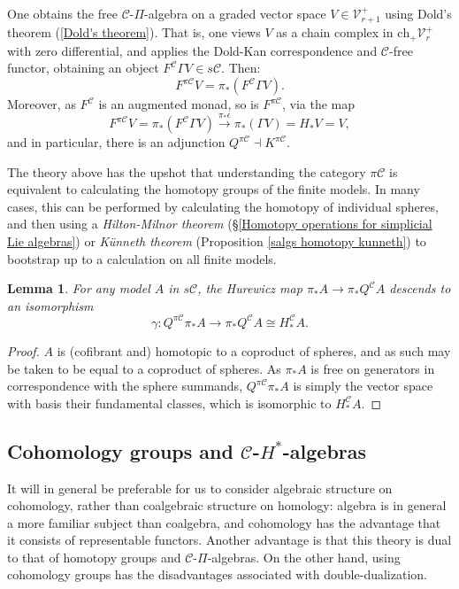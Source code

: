 \documentclass[11pt]{amsart} \renewcommand{\baselinestretch}{1.4}
\theoremstyle{plain}
\newtheorem{lem}[thm]{Lemma}
\theoremstyle{definition}
\renewcommand{\to}{\longrightarrow}
\newcommand{\calC}{\mathcal{C}}
\newcommand{\calV}{\mathcal{V}}
\newcommand{\calc}{\mathcal{C}}
\newcommand{\vect}[2]{\calV^{#1}_{#2}}
\newcommand{\PA}[1]{\pi#1}
\newcommand{\complexes}{\mathrm{ch}_+}
\begin{document}
\begin{Pi-algebras and cohomology algebras}
One obtains the free $\calc$-$\Pi$-algebra on a graded vector space $V\in \vect{+}{r+1}$ using Dold's theorem (\ref{Dold's theorem}). That is, one views $V$ as a chain complex in $\complexes\vect{+}{r}$ with zero differential, and applies the Dold-Kan correspondence and $\calc$-free functor, obtaining an object $F^\calc\Gamma V\in s\calc$. Then:
\[F^{\PA{\calc}}V=\pi_*(F^\calc\Gamma V).\]
Moreover, as $F^\calc $ is an augmented monad, so is $F^{\PA{\calc}}$, via the map
\[F^{\PA{\calc}}V=\pi_*(F^\calc\Gamma V)\overset{\pi_*\epsilon}{\to}\pi_*(\Gamma V)=H_*V=V,\]
and in particular, there is an adjunction $Q^{\PA{\calc}}\dashv K^{\PA{\calc}}$.

The theory above has the upshot that understanding the category $\PA{\calc}$ is equivalent to calculating the homotopy groups of the finite models. In many cases, this can be performed by calculating the homotopy of individual spheres, and then using a \emph{Hilton-Milnor theorem} (\S\ref{Homotopy operations for simplicial Lie algebras}) or \emph{K\"unneth theorem} (Proposition \ref{salgs homotopy kunneth}) to bootstrap up to a calculation on all finite models.



\begin{lem}
\label{Q of a model}
For any model $A$ in $s\calc$, the Hurewicz map $\pi_*A\to \pi_*Q^\calc A$ descends to an isomorphism
\[\gamma:Q^{\PA{\calc}}\pi_* A\to \pi_* Q^{\calc}A\cong H_*^{\calc}A.\]
\end{lem}
\begin{proof} $A$ is (cofibrant and) homotopic to a coproduct of spheres, and as such may be taken to be equal to a coproduct of spheres. As $\pi_* A$ is free on generators in correspondence with the sphere summands, $Q^{\PA{\calc}}\pi_* A$ is simply the vector space with basis their fundamental classes, which is isomorphic to $H_*^{\calc}A$.
\end{proof}
\subsection{Cohomology groups and $\calc$-$H^*$-algebras}\label{cohomology and Halgs}
It will in general be preferable for us to consider algebraic structure on cohomology, rather than coalgebraic structure on homology: algebra is in general a more familiar subject than coalgebra, and cohomology has the advantage that it consists of representable functors. 
Another advantage is that this theory is dual to that of homotopy groups and $\calC$-$\Pi$-algebras. On the other hand, using cohomology groups has the disadvantages associated with double-dualization.


\end{Pi-algebras and cohomology algebras}
\end{document}
